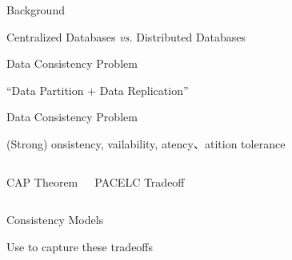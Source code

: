 
\begin{frame}{Background}
	\begin{center}
		Centralized Databases \emph{vs.} Distributed Databases

	\end{center}
\end{frame}

\begin{frame}{Data Consistency Problem}
	\begin{center}
		``Data Partition + Data Replication''
	\end{center}
\end{frame}

\begin{frame}{Data Consistency Problem}
	\begin{center}
		(Strong) \underline{}onsistency, \underline{}vailability,
		\underline{}atency、\underline{}atition tolerance
	\end{center}
	\begin{columns}[c]
		\begin{center}
			CAP Theorem \\[2pt]
		\end{center}
		\begin{center}

			\vspace{0.50cm}
			PACELC Tradeoff \\[2pt]
		\end{center}
	\end{columns}
\end{frame}

\begin{frame}{Consistency Models}
	\begin{center}
		Use  to capture these tradeoffs
	\end{center}

	\begin{columns}[c]
		\begin{center}
		\end{center}
		\begin{center}
		\end{center}
	\end{columns}
\end{frame}

